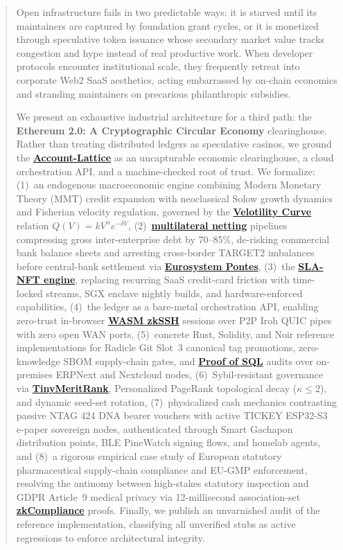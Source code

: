 \documentclass[a4paper,11pt,twoside,parskip=half-,headings=small]{scrartcl}
\newcommand{\concept}[2]{\hyperlink{glossary:#1}{\textbf{#2}}}
\begin{document}
\begin{abstract}
\setlength{\parindent}{0pt}
\setlength{\parskip}{0.5\baselineskip}
\noindent
Open infrastructure fails in two predictable ways: it is starved until its
maintainers are captured by foundation grant cycles, or it is monetized through
speculative token issuance whose secondary market value tracks congestion and
hype instead of real productive work. When developer protocols encounter
institutional scale, they frequently retreat into corporate Web2 SaaS aesthetics,
acting embarrassed by on-chain economics and stranding maintainers on
precarious philanthropic subsidies.

\noindent
We present an exhaustive industrial architecture for a third path: the
\textbf{Ethereum 2.0: A Cryptographic Circular Economy} clearinghouse. Rather than treating distributed
ledgers as speculative casinos, we ground the \concept{account_lattice}{Account-Lattice} as an uncapturable
economic clearinghouse, a cloud orchestration API, and a machine-checked root of
trust. We formalize:
(1)~an endogenous macroeconomic engine combining Modern Monetary Theory (MMT)
credit expansion with neoclassical Solow growth dynamics~\cite{solow1956,cobbdouglas1928}
and Fisherian velocity regulation, governed by the \concept{velotility}{Velotility Curve} relation
$Q(V) = k V^\alpha e^{-\delta V}$,
(2)~\concept{netting}{multilateral netting} pipelines compressing gross inter-enterprise debt by
70--85\%, de-risking commercial bank balance sheets and arresting cross-border
TARGET2 imbalances before central-bank settlement via \concept{pontes}{Eurosystem Pontes},
(3)~the \concept{sla_nft}{SLA-NFT engine}, replacing recurring SaaS credit-card friction with
time-locked streams, SGX enclave nightly builds, and hardware-enforced capabilities,
(4)~the ledger as a bare-metal orchestration API, enabling zero-trust in-browser
\concept{zkssh}{WASM zkSSH} sessions over P2P Iroh QUIC pipes with zero open WAN ports,
(5)~concrete Rust, Solidity, and Noir reference implementations for Radicle Git Slot~3
canonical tag promotions, zero-knowledge SBOM supply-chain gates, and \concept{posql}{Proof of SQL}
audits over on-premises ERPNext and Nextcloud nodes,
(6)~Sybil-resistant governance via \concept{merit_rank}{TinyMeritRank}, Personalized PageRank topological
decay ($\kappa \le 2$), and dynamic seed-set rotation,
(7)~physicalized cash mechanics contrasting passive NTAG 424 DNA bearer vouchers
with active TICKEY ESP32-S3 e-paper sovereign nodes, authenticated through
Smart Gachapon distribution points, BLE PineWatch signing flows, and homelab agents,
and (8)~a rigorous empirical case study of European statutory pharmaceutical
supply-chain compliance and EU-GMP enforcement, resolving the antinomy between high-stakes
statutory inspection and GDPR Article~9 medical privacy via 12-millisecond association-set
\concept{zkcompliance}{zkCompliance} proofs.
Finally, we publish an unvarnished audit of the reference implementation,
classifying all unverified stubs as active regressions to enforce architectural
integrity.
\end{abstract}
\end{document}
